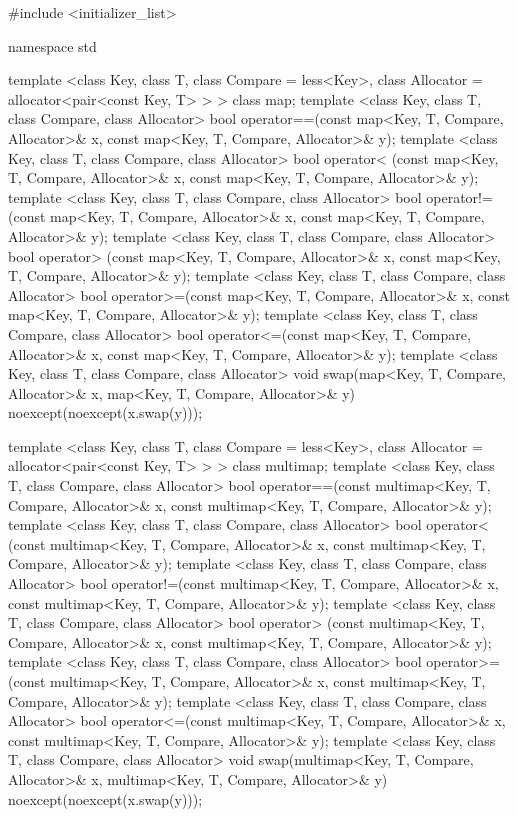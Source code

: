 %
\begin{codeblock}
#include <initializer_list>

namespace std {

  template <class Key, class T, class Compare = less<Key>,
            class Allocator = allocator<pair<const Key, T> > >
    class map;
  template <class Key, class T, class Compare, class Allocator>
    bool operator==(const map<Key, T, Compare, Allocator>& x,
                    const map<Key, T, Compare, Allocator>& y);
  template <class Key, class T, class Compare, class Allocator>
    bool operator< (const map<Key, T, Compare, Allocator>& x,
                    const map<Key, T, Compare, Allocator>& y);
  template <class Key, class T, class Compare, class Allocator>
    bool operator!=(const map<Key, T, Compare, Allocator>& x,
                    const map<Key, T, Compare, Allocator>& y);
  template <class Key, class T, class Compare, class Allocator>
    bool operator> (const map<Key, T, Compare, Allocator>& x,
                    const map<Key, T, Compare, Allocator>& y);
  template <class Key, class T, class Compare, class Allocator>
    bool operator>=(const map<Key, T, Compare, Allocator>& x,
                    const map<Key, T, Compare, Allocator>& y);
  template <class Key, class T, class Compare, class Allocator>
    bool operator<=(const map<Key, T, Compare, Allocator>& x,
                    const map<Key, T, Compare, Allocator>& y);
  template <class Key, class T, class Compare, class Allocator>
    void swap(map<Key, T, Compare, Allocator>& x,
              map<Key, T, Compare, Allocator>& y)
      noexcept(noexcept(x.swap(y)));

  template <class Key, class T, class Compare = less<Key>,
            class Allocator = allocator<pair<const Key, T> > >
    class multimap;
  template <class Key, class T, class Compare, class Allocator>
    bool operator==(const multimap<Key, T, Compare, Allocator>& x,
                    const multimap<Key, T, Compare, Allocator>& y);
  template <class Key, class T, class Compare, class Allocator>
    bool operator< (const multimap<Key, T, Compare, Allocator>& x,
                    const multimap<Key, T, Compare, Allocator>& y);
  template <class Key, class T, class Compare, class Allocator>
    bool operator!=(const multimap<Key, T, Compare, Allocator>& x,
                    const multimap<Key, T, Compare, Allocator>& y);
  template <class Key, class T, class Compare, class Allocator>
    bool operator> (const multimap<Key, T, Compare, Allocator>& x,
                    const multimap<Key, T, Compare, Allocator>& y);
  template <class Key, class T, class Compare, class Allocator>
    bool operator>=(const multimap<Key, T, Compare, Allocator>& x,
                    const multimap<Key, T, Compare, Allocator>& y);
  template <class Key, class T, class Compare, class Allocator>
    bool operator<=(const multimap<Key, T, Compare, Allocator>& x,
                    const multimap<Key, T, Compare, Allocator>& y);
  template <class Key, class T, class Compare, class Allocator>
    void swap(multimap<Key, T, Compare, Allocator>& x,
              multimap<Key, T, Compare, Allocator>& y)
      noexcept(noexcept(x.swap(y)));
}
\end{codeblock}

